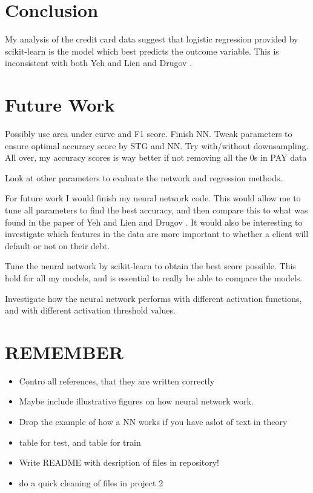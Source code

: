 \documentclass[a4paper,11pt,twocolumn]{article}
\begin{document}
\section{Conclusion}
My analysis of the credit card data suggest that logistic regression provided by scikit-learn is the model which best predicts the outcome variable. This is inconsistent with both Yeh and Lien \cite{data} and Drugov \cite{vladimir}.    

\section{Future Work}
Possibly use area under curve and F1 score. Finish NN. Tweak parameters to ensure optimal accuracy score by STG and NN. Try with/without downsampling. All over, my accuracy scores is way better if not removing all the 
0s in PAY data

Look at other parameters to evaluate the network and regression methods.

For future work I would finish my neural network code. This would allow me to tune all parameters to find the best accuracy, and then compare this to what was found in the paper of Yeh and Lien and Drugov \cite{vladimir}. It would also be interesting to investigate which features in the data are more important to whether a client will default or not on their debt.   

Tune the neural network by scikit-learn to obtain the best score possible. This hold for all my models, and is essential to really be able to compare the models. 

Investigate how the neural network performs with different activation functions, and with different activation threshold values.  

\section{REMEMBER}
\begin{itemize}
\item Contro all references, that they are written correctly 
\item Maybe include illustrative figures on how neural network work.
\item Drop the example of how a NN works if you have aslot of text in theory
\item table for test, and table for train
\item Write README with desription of files in repository!
\item do a quick cleaning of files in project 2
\end{itemize}
 
\end{document}
